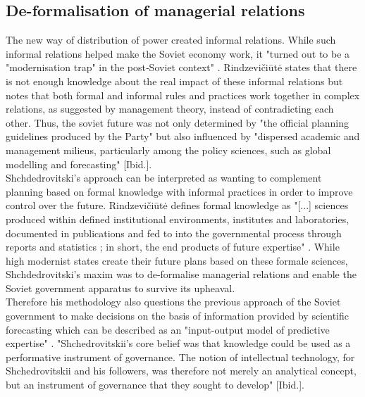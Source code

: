 \documentclass[11pt,a4paper]{article}
\begin{document}
\subsection{De-formalisation of managerial relations}
The new way of distribution of power created informal relations. While such informal relations helped make the Soviet economy work, it "turned out to be a "modernisation trap" in the post‑Soviet context" \cite[p. 2]{Rindzeviit2015}. Rindzevičiūtė states that there is not enough knowledge about the real impact of these informal relations but notes that both formal and informal rules and practices work together in complex relations, as suggested by management theory, instead of contradicting each other. Thus, the soviet future was not only determined by "the official planning guidelines produced by the Party" \cite[p. 2]{Rindzeviit2015} but also influenced by "dispersed academic and management milieus, particularly among the policy sciences, such as global modelling and forecasting" [Ibid.]. \\
Shchdedrovitski’s approach can be interpreted as wanting to complement planning based on formal knowledge with informal practices in order to improve control over the future. Rindzevičiūtė defines formal knowledge as "[...] sciences produced within defined institutional environments, institutes and laboratories, documented in publications and fed to into the governmental process through reports and statistics ; in short, the end products of future expertise" \cite[p. 3]{Rindzeviit2015}. While high modernist states create their future plans based on these formale sciences, Shchdedrovitski’s maxim was to de-formalise managerial relations and enable the Soviet government apparatus to survive its upheaval. \\
Therefore his methodology also questions the previous approach of the Soviet government to make decisions on the basis of information provided by scientific forecasting which can be described as an "input-output model of predictive expertise" \cite[p. 4]{Rindzeviit2015}. "Shchedrovitskii’s core belief was that knowledge could be used as a performative instrument of governance. The notion of intellectual technology, for Shchedrovitskii and his followers, was therefore not merely an analytical concept, but an instrument of governance that they sought to develop" [Ibid.]. 
\end{document}
